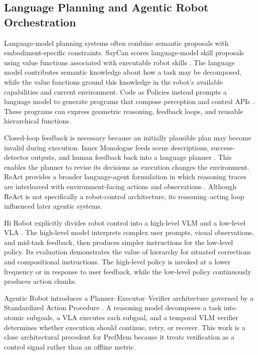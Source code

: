 \documentclass{article}
\begin{document}
\subsection{Language Planning and Agentic Robot Orchestration}
\label{subsec:related-orchestration}

Language-model planning systems often combine semantic proposals with
embodiment-specific constraints. SayCan scores language-model skill proposals
using value functions associated with executable robot skills
\parencite{ahn2022saycan}. The language model contributes semantic knowledge
about how a task may be decomposed, while the value functions ground this
knowledge in the robot's available capabilities and current environment.
Code as Policies instead prompts a language model to generate programs that
compose perception and control APIs
\parencite{liang2022codeaspolicies}. These programs can express geometric
reasoning, feedback loops, and reusable hierarchical functions.

Closed-loop feedback is necessary because an initially plausible plan may
become invalid during execution. Inner Monologue feeds scene descriptions,
success-detector outputs, and human feedback back into a language planner
\parencite{huang2022innermonologue}. This enables the planner to revise its
decisions as execution changes the environment. ReAct provides a broader
language-agent formulation in which reasoning traces are interleaved with
environment-facing actions and observations
\parencite{yao2023react}. Although ReAct is not specifically a robot-control
architecture, its reasoning--acting loop influenced later agentic systems.

Hi Robot explicitly divides robot control into a high-level VLM and a
low-level VLA \parencite{shi2025hirobot}. The high-level model interprets
complex user prompts, visual observations, and mid-task feedback, then produces
simpler instructions for the low-level policy. Its evaluation demonstrates the
value of hierarchy for situated corrections and compositional instructions.
The high-level policy is invoked at a lower frequency or in response to user
feedback, while the low-level policy continuously produces action chunks.

Agentic Robot introduces a Planner--Executor--Verifier architecture governed by
a Standardized Action Procedure
\parencite{yang2025agenticrobot}. A reasoning model decomposes a task into
atomic subgoals, a VLA executes each subgoal, and a temporal VLM verifier
determines whether execution should continue, retry, or recover. This work is a
close architectural precedent for PrefMem because it treats verification as a
control signal rather than an offline metric.
\end{document}
